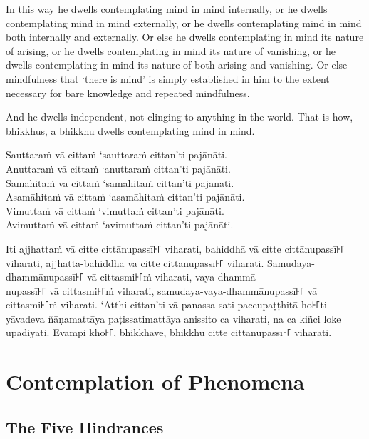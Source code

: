 In this way he dwells contemplating mind in mind internally, or he dwells
contemplating mind in mind externally, or he dwells contemplating mind in mind
both internally and externally. Or else he dwells contemplating in mind its
nature of arising, or he dwells contemplating in mind its nature of vanishing,
or he dwells contemplating in mind its nature of both arising and vanishing. Or
else mindfulness that ‘there is mind’ is simply established in him to the extent
necessary for bare knowledge and repeated mindfulness.

And he dwells independent, not clinging to anything in the world. That is how,
bhikkhus, a bhikkhu dwells contemplating mind in mind.


\paliPage

Sauttaraṁ vā cittaṁ ‘sauttaraṁ cittan’ti pajānāti.\\
Anuttaraṁ vā cittaṁ ‘anuttaraṁ cittan’ti pajānāti.\\
Samāhitaṁ vā cittaṁ ‘samāhitaṁ cittan’ti pajānāti.\\
Asamāhitaṁ vā cittaṁ ‘asamāhitaṁ cittan’ti pajānāti.\\
Vimuttaṁ vā cittaṁ ‘vimuttaṁ cittan’ti pajānāti.\\
Avimuttaṁ vā cittaṁ ‘avimuttaṁ cittan’ti pajānāti.

Iti ajjhattaṁ vā citte cittānupassī꜔꜒ viharati, bahiddhā vā citte cittānupassī꜔꜒
viharati, ajjhatta-bahiddhā vā citte cittānupassī꜔꜒ viharati.
Samudaya-dhammānupassī꜔꜒ vā cittasmi꜔꜒ṁ viharati, vaya-dhammā-\\
nupassī꜔꜒ vā cittasmi꜔꜒ṁ viharati, samudaya-vaya-dhammānupassī꜔꜒ vā cittasmi꜔꜒ṁ
viharati. ‘Atthi cittan’ti vā panassa sati paccupaṭṭhitā ho꜔꜒ti yāvadeva
ñāṇamattāya paṭissatimattāya anissito ca viharati, na ca kiñci loke upādiyati.
Evampi kho꜔꜒, bhikkhave, bhikkhu citte cittānupassī꜔꜒ viharati.


\englishPage

\paliPage

\englishPage
\chapter{Contemplation of Phenomena}

\section{The Five Hindrances}

